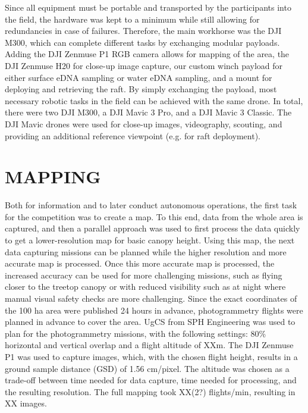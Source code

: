     Since all equipment must be portable and transported by the participants into the field, the hardware was kept to a minimum while still allowing for redundancies in case of failures. Therefore, the main workhorse was the DJI M300, which can complete different tasks by exchanging modular payloads. Adding the DJI Zenmuse P1 RGB camera allows for mapping of the area, the DJI Zenmuse H20 for close-up image capture, our custom winch payload for either surface eDNA sampling or water eDNA sampling, and a mount for deploying and retrieving the raft. By simply exchanging the payload, most necessary robotic tasks in the field can be achieved with the same drone. In total, there were two DJI M300, a DJI Mavic 3 Pro, and a DJI Mavic 3 Classic. The DJI Mavic drones were used for close-up images, videography, scouting, and providing an additional reference viewpoint (e.g. for raft deployment).

	\section{MAPPING}

 


Both for information and to later conduct autonomous operations, the first task for the competition was to create a map. To this end, data from the whole area is captured, and then a parallel approach was used to first process the data quickly to get a lower-resolution map for basic canopy height. Using this map, the next data capturing missions can be planned while the higher resolution and more accurate map is processed. Once this more accurate map is processed, the increased accuracy can be used for more challenging missions, such as flying closer to the treetop canopy or with reduced visibility such as at night where manual visual safety checks are more challenging.
Since the exact coordinates of the 100 ha area were published 24 hours in advance, photogrammetry flights were planned in advance to cover the area. UgCS from SPH Engineering \cite{Engineering} was used to plan for the photogrammetry missions, with the following settings: 80\% horizontal and vertical overlap and a flight altitude of XXm. The DJI Zenmuse P1 was used to capture images, which, with the chosen flight height, results in a ground sample distance (GSD) of 1.56 cm/pixel. The altitude was chosen as a trade-off between time needed for data capture, time needed for processing, and the resulting resolution. The full mapping took XX(2?) flights/min, resulting in XX images.

